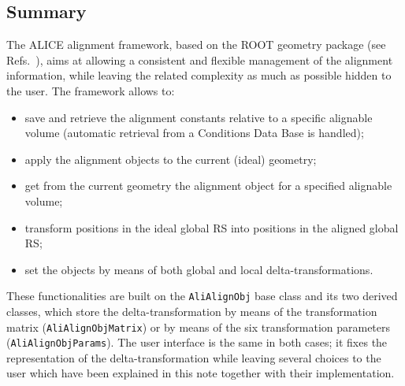 \documentclass[12pt,a4paper,twoside]{article}
\makeatletter
\newcommand {\ROOT} {ROOT\@\xspace}
\newcommand{\FR}{ALICE alignment framework}
\makeatother
\begin{document}
{\subsection{Summary}
\label{sec:Summary}

The \FR, based on the \ROOT geometry package (see
Refs.~\cite{rootUG,tgeo}), aims at allowing a consistent and flexible
management of the alignment information, while leaving the related
complexity as much as possible hidden to the user.  The framework
allows to:
\begin{itemize}
  \item save and retrieve the alignment constants relative
  to a specific alignable volume (automatic retrieval from a
  Conditions Data Base is handled);
  \item apply the alignment objects to the
  current (ideal) geometry;
  \item get from the current geometry the
  alignment object for a specified alignable volume;
  \item transform positions in the ideal global
  RS into positions in the aligned global RS;
  \item set the objects by means of both global and local
  delta-transformations. 
\end{itemize}
These functionalities are built on the \lstinline!AliAlignObj! base
class and its two derived classes, which store the
delta-transformation by means of the transformation matrix
(\lstinline!AliAlignObjMatrix!) or by means of the six transformation
parameters (\lstinline!AliAlignObjParams!). The user interface is the
same in both cases; it fixes the representation of the
delta-transformation while leaving several choices to the user which
have been explained in this note together with their implementation.

}
\end{document}
